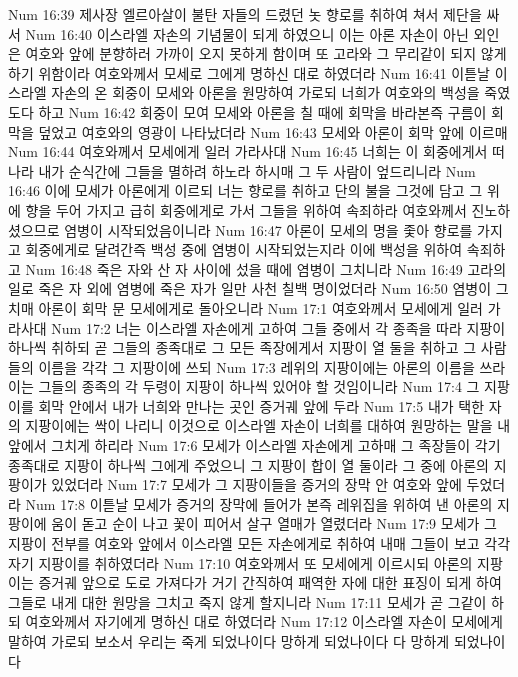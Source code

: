 Num 16:39  제사장 엘르아살이 불탄 자들의 드렸던 놋 향로를 취하여 쳐서 제단을 싸서
Num 16:40  이스라엘 자손의 기념물이 되게 하였으니 이는 아론 자손이 아닌 외인은 여호와 앞에 분향하러 가까이 오지 못하게 함이며 또 고라와 그 무리같이 되지 않게 하기 위함이라 여호와께서 모세로 그에게 명하신 대로 하였더라
Num 16:41  이튿날 이스라엘 자손의 온 회중이 모세와 아론을 원망하여 가로되 너희가 여호와의 백성을 죽였도다 하고
Num 16:42  회중이 모여 모세와 아론을 칠 때에 회막을 바라본즉 구름이 회막을 덮었고 여호와의 영광이 나타났더라
Num 16:43  모세와 아론이 회막 앞에 이르매
Num 16:44  여호와께서 모세에게 일러 가라사대
Num 16:45  너희는 이 회중에게서 떠나라 내가 순식간에 그들을 멸하려 하노라 하시매 그 두 사람이 엎드리니라
Num 16:46  이에 모세가 아론에게 이르되 너는 향로를 취하고 단의 불을 그것에 담고 그 위에 향을 두어 가지고 급히 회중에게로 가서 그들을 위하여 속죄하라 여호와께서 진노하셨으므로 염병이 시작되었음이니라
Num 16:47  아론이 모세의 명을 좇아 향로를 가지고 회중에게로 달려간즉 백성 중에 염병이 시작되었는지라 이에 백성을 위하여 속죄하고
Num 16:48  죽은 자와 산 자 사이에 섰을 때에 염병이 그치니라
Num 16:49  고라의 일로 죽은 자 외에 염병에 죽은 자가 일만 사천 칠백 명이었더라
Num 16:50  염병이 그치매 아론이 회막 문 모세에게로 돌아오니라
Num 17:1  여호와께서 모세에게 일러 가라사대
Num 17:2  너는 이스라엘 자손에게 고하여 그들 중에서 각 종족을 따라 지팡이 하나씩 취하되 곧 그들의 종족대로 그 모든 족장에게서 지팡이 열 둘을 취하고 그 사람들의 이름을 각각 그 지팡이에 쓰되
Num 17:3  레위의 지팡이에는 아론의 이름을 쓰라 이는 그들의 종족의 각 두령이 지팡이 하나씩 있어야 할 것임이니라
Num 17:4  그 지팡이를 회막 안에서 내가 너희와 만나는 곳인 증거궤 앞에 두라
Num 17:5  내가 택한 자의 지팡이에는 싹이 나리니 이것으로 이스라엘 자손이 너희를 대하여 원망하는 말을 내 앞에서 그치게 하리라
Num 17:6  모세가 이스라엘 자손에게 고하매 그 족장들이 각기 종족대로 지팡이 하나씩 그에게 주었으니 그 지팡이 합이 열 둘이라 그 중에 아론의 지팡이가 있었더라
Num 17:7  모세가 그 지팡이들을 증거의 장막 안 여호와 앞에 두었더라
Num 17:8  이튿날 모세가 증거의 장막에 들어가 본즉 레위집을 위하여 낸 아론의 지팡이에 움이 돋고 순이 나고 꽃이 피어서 살구 열매가 열렸더라
Num 17:9  모세가 그 지팡이 전부를 여호와 앞에서 이스라엘 모든 자손에게로 취하여 내매 그들이 보고 각각 자기 지팡이를 취하였더라
Num 17:10  여호와께서 또 모세에게 이르시되 아론의 지팡이는 증거궤 앞으로 도로 가져다가 거기 간직하여 패역한 자에 대한 표징이 되게 하여 그들로 내게 대한 원망을 그치고 죽지 않게 할지니라
Num 17:11  모세가 곧 그같이 하되 여호와께서 자기에게 명하신 대로 하였더라
Num 17:12  이스라엘 자손이 모세에게 말하여 가로되 보소서 우리는 죽게 되었나이다 망하게 되었나이다 다 망하게 되었나이다
